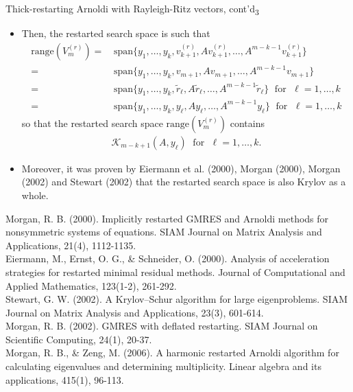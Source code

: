 \documentclass[t,usepdftitle=false]{beamer}
\begin{document}
\begin{frame}{Thick-restarting Arnoldi with Rayleigh-Ritz vectors, cont'd\textsubscript{3}}
\begin{itemize}
\item Then, the restarted search space is such that\vspace{-.1cm}
\begin{align*}
\text{range}(V_m^{(r)})
=&\,
\text{span}\{y_1,\dots,y_k,v_{k+1}^{(r)},Av_{k+1}^{(r)},\dots,A^{m-k-1}v_{k+1}^{(r)}\}\\
=&\,
\text{span}\{y_1,\dots,y_k,v_{m+1},Av_{m+1},\dots,A^{m-k-1}v_{m+1}\}\\
=&\,
\text{span}\{y_1,\dots,y_k,\tilde{r}_\ell,A\tilde{r}_\ell,\dots,A^{m-k-1}\tilde{r}_\ell\}
\;\text{ for }\;
\ell=1,\dots,k\\
=&\,
\text{span}\{y_1,\dots,y_k,y_\ell,Ay_\ell,\dots,A^{m-k-1}y_\ell\}
\;\text{ for }\;
\ell=1,\dots,k
\end{align*}
so that the restarted search space $\text{range}(V_m^{(r)})$ contains\vspace{-.1cm}
\begin{align*}
\mathcal{K}_{m-k+1}(A,y_\ell)
\;\text{ for }\;
\ell=1,\dots,k.
\end{align*}
\item[] Moreover, it was proven by Eiermann et al. (2000), Morgan (2000), Morgan (2002) and Stewart (2002) that the restarted search space is also Krylov as a whole.
\end{itemize}\smallskip
\tiny{Morgan, R. B. (2000). Implicitly restarted GMRES and Arnoldi methods for nonsymmetric systems of equations. SIAM
Journal on Matrix Analysis and Applications, 21(4), 1112-1135.}\\
\tiny{Eiermann, M., Ernst, O. G., \& Schneider, O. (2000). Analysis of acceleration strategies for restarted minimal residual methods. Journal of Computational and Applied Mathematics, 123(1-2), 261-292.}\\
\tiny{Stewart, G. W. (2002). A Krylov–Schur algorithm for large eigenproblems. SIAM Journal on Matrix Analysis and
Applications, 23(3), 601-614.}\\
\tiny{Morgan, R. B. (2002). GMRES with deflated restarting. SIAM Journal on Scientific Computing, 24(1), 20-37.}\\
\tiny{Morgan, R. B., \& Zeng, M. (2006). A harmonic restarted Arnoldi algorithm for calculating eigenvalues and determining
multiplicity. Linear algebra and its applications, 415(1), 96-113.}
\end{frame}
\end{document}
